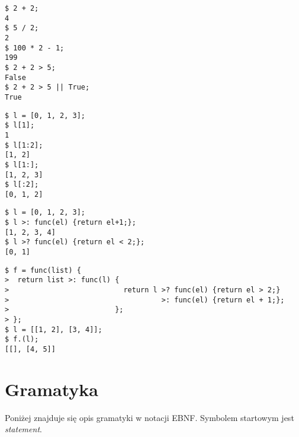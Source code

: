 \documentclass{article}
\begin{document}
\begin{lstlisting}[frame=tb, title={Operacje na typach prostych}]
$ 2 + 2;
4
$ 5 / 2;
2
$ 100 * 2 - 1;
199
$ 2 + 2 > 5;
False
$ 2 + 2 > 5 || True;
True
\end{lstlisting}
\begin{lstlisting}[frame=tb, title={Pobieranie elementów listy}]
$ l = [0, 1, 2, 3];
$ l[1];
1
$ l[1:2];
[1, 2]
$ l[1:];
[1, 2, 3]
$ l[:2];
[0, 1, 2]
\end{lstlisting}
\begin{lstlisting}[frame=tb, title={Operacje \textit{map} i \textit{filter}}]
$ l = [0, 1, 2, 3];
$ l >: func(el) {return el+1;};
[1, 2, 3, 4]
$ l >? func(el) {return el < 2;};
[0, 1]
\end{lstlisting}
\begin{lstlisting}[frame=tb, title={Obiekty funkcyjne}]
$ f = func(list) {
>  return list >: func(l) {
>                           return l >? func(el) {return el > 2;}
>                                    >: func(el) {return el + 1;};
>                         };
> };
$ l = [[1, 2], [3, 4]];
$ f.(l);
[[], [4, 5]]
\end{lstlisting}

\section{Gramatyka}
	Poniżej znajduje się opis gramatyki w notacji EBNF. Symbolem startowym jest \textit{statement}.

	\renewcommand{\syntleft}{\normalfont\itshape}
	\renewcommand{\syntright}{}
\end{document}
